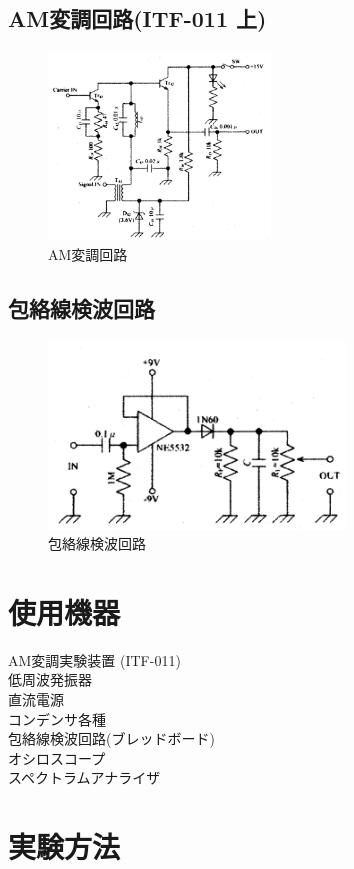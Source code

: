 \subsection{AM変調回路(ITF-011 上)}
\begin{figure}[H]
  \centering
  \includegraphics[height=5cm]{./img/fig7.png}
  \caption{AM変調回路}
\end{figure}

\subsection{包絡線検波回路}
\begin{figure}[H]
  \centering
  \includegraphics[height=5cm]{./img/fig8.png}
  \caption{包絡線検波回路}
\end{figure}

\section{使用機器}
AM変調実験装置 (ITF-011)\\
低周波発振器\\
直流電源\\
コンデンサ各種\\
包絡線検波回路(ブレッドボード)\\
オシロスコープ\\
スペクトラムアナライザ\\

\section{実験方法}
